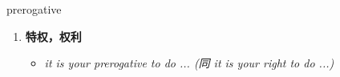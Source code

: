 
\begin{frame}
{\huge prerogative}
\begin{center}
\begin{enumerate}\Large
  \item \textbf{特权，权利}
  \begin{itemize}
    \item \em{\Large{it is your prerogative to do ... (同 it is your right to do ...)}}
  \end{itemize}
\end{enumerate}
\end{center}
\end{frame}
